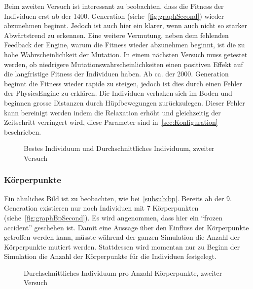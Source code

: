       Beim zweiten Versuch ist interessant zu beobachten,
      dass die Fitness der Individuen erst ab der 1400\@. Generation (siehe~\vref{fig:graphSecond})
      wieder abzunehmen beginnt.
      Jedoch ist auch hier ein klarer, wenn auch nicht so starker Abwärtstrend zu erkennen.
      Eine weitere Vermutung, neben dem fehlenden Feedback der Engine, warum die Fitness wieder abzunehmen beginnt,
      ist die zu hohe Wahrscheinlichkeit der Mutation.
      In einem nächsten Versuch muss getestet werden,
      ob niedrigere Mutationswahrscheinlichkeiten einen positiven Effekt auf die langfristige Fitness der Individuen haben.
      Ab ca\@. der 2000\@. Generation beginnt die Fitness wieder rapide zu steigen,
      jedoch ist dies durch einen Fehler der \gls{PhysicsEngine} zu erklären.
      Die Individuen verhaken sich im Boden und beginnen grosse Distanzen durch Hüpfbewegungen zurückzulegen.
      Dieser Fehler kann bereinigt werden indem die Relaxation erhöht und gleichzeitig der Zeitschritt verringert wird,
      diese Parameter sind in~\vref{sec:Konfiguration} beschrieben.

      \begin{figure}[H]
        \centering
        
        \caption{Bestes Individuum und Durchschnittliches Individuum, zweiter Versuch\label{fig:graphSecond}}
      \end{figure}

      \subsubsection{Körperpunkte\label{subsub:bpScnd}}

        Ein ähnliches Bild ist zu beobachten, wie bei~\vref{subsub:bp}.
        Bereits ab der 9\@. Generation existieren nur noch Individuen mit 7 Körperpunkten (siehe~\vref{fig:graphBpSecond}).
        Es wird angenommen, dass hier ein ``frozen accident'' geschehen ist.
        Damit eine Aussage über den Einfluss der Körperpunkte getroffen werden kann,
        müsste während der ganzen Simulation die Anzahl der Körperpunkte mutiert werden.
        Stattdessen wird momentan nur zu Beginn der Simulation die Anzahl der Körperpunkte für die Individuen festgelegt.

        \begin{figure}[H]
          \centering
          
          \caption{Durchschnittliches Individuum pro Anzahl Körperpunkte, zweiter Versuch\label{fig:graphBpSecond}}
        \end{figure}


